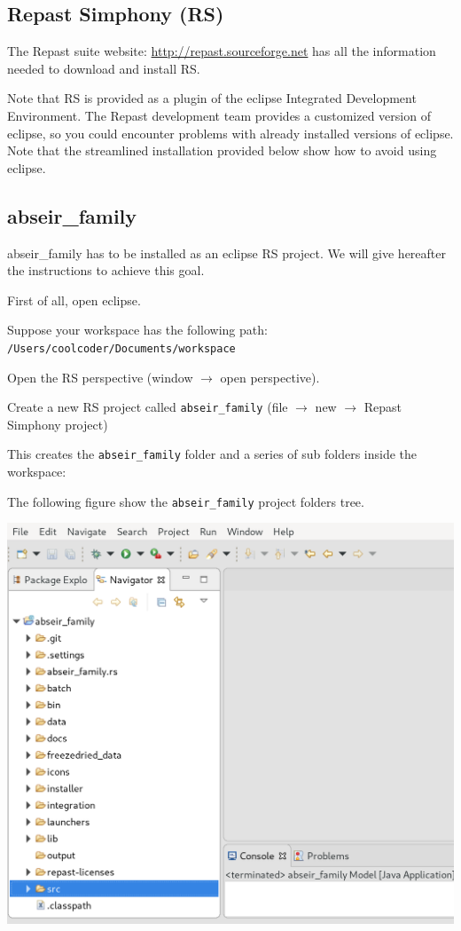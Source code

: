 \documentclass{article}
\begin{document}
\subsection{Repast Simphony (RS)}

The Repast suite website: \url{http://repast.sourceforge.net} has all the information needed to download and install RS.

Note that RS is provided as a plugin of the eclipse Integrated Development Environment. The Repast development team provides a customized version of eclipse, so you could encounter problems with already installed versions of eclipse. Note that the streamlined installation provided below show how to avoid using eclipse.

\subsection{abseir\_family}

abseir\_family has to be installed as an eclipse RS project. We will give hereafter the instructions to achieve this goal.

First of all, open eclipse.

Suppose your workspace has the following path:\\
\verb+/Users/coolcoder/Documents/workspace+

Open the RS perspective (window $\rightarrow$ open perspective).

Create a new RS project called \verb+abseir_family+ (file $\rightarrow$ new $\rightarrow$ Repast Simphony project)

This creates the \verb+abseir_family+ folder and a series of sub folders inside the workspace:

The following figure show the \verb+abseir_family+ project folders tree.

\vskip2mm
\noindent
\includegraphics[scale=0.2]{fig_abseir_rs_navigation}
\end{document}
